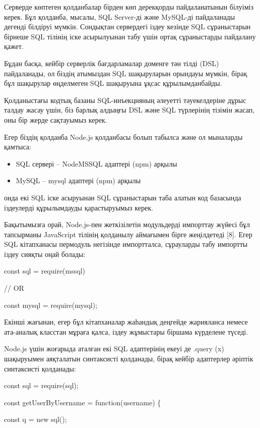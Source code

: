 Серверде көптеген қолданбалар бірден көп дерекқорды пайдаланатынын
білуіміз керек. Бұл қолданба, мысалы, SQL Server-ді және MySQL-ді
пайдаланады дегенді білдіруі мүмкін. Сондықтан сервердегі іздеу кезінде
SQL сұраныстарын бірнеше SQL тілінің іске асырылуынан табу үшін ортақ
сұраныстарды пайдалану қажет.

Бұдан басқа, кейбір серверлік бағдарламалар доменге тән тілді (DSL)
пайдаланады, ол біздің атымыздан SQL шақыруларын орындауы мүмкін, бірақ
бұл шақырулар өңделмеген SQL шақыруына ұқсас құрылымданбайды.

Қолданыстағы кодтық базаны SQL-инъекцияның әлеуетті тәуекелдеріне дұрыс
талдау жасау үшін, біз барлық алдыңғы DSL және SQL түрлерінің тізімін
жасап, оны бір жерде сақтауымыз керек.

Егер біздің қолданба Node.js қолданбасы болып табылса және ол мыналарды
қамтыса:

\begin{itemize}
\item
  SQL сервері -- NodeMSSQL адаптері (npm) арқылы
\item
  MySQL -- mysql адаптері (npm) арқылы
\end{itemize}

онда екі SQL іске асыруынан SQL сұраныстарын таба алатын код базасында
іздеулерді құрылымдауды қарастыруымыз керек.

Бақытымызға орай, Node.js-пен жеткізілетін модульдерді импорттау жүйесі
бұл тапсырманы JavaScript тілінің қолданылу аймағымен бірге жеңілдетеді
{[}8{]}. Егер SQL кітапханасы пермодуль негізінде импортталса,
сұрауларды табу импортты іздеу сияқты оңай болады:

const sql = require(\textquotesingle mssql\textquotesingle)

// OR

const mysql = require(\textquotesingle mysql\textquotesingle);

Екінші жағынан, егер бұл кітапханалар жаһандық деңгейде жарияланса
немесе ата-аналық класстан мұраға қалса, іздеу жұмыстары біршама
күрделене түседі.

Node.js үшін жоғарыда аталған екі SQL адаптерінің екеуі де .query (x)
шақыруымен аяқталатын синтаксисті қолданады, бірақ кейбір адаптерлер
әріптік синтаксисті қолданады:

const sql = require(\textquotesingle sql\textquotesingle);

const getUserByUsername = function(username) \{

const q = new sql();

